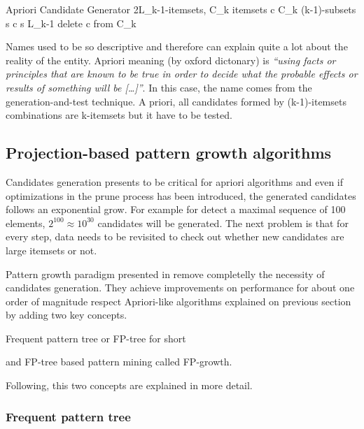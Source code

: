 \begin{pseudocode}{Apriori Candidate Generator 2}{L_{k-1}-itemsets, C_{k}}
\label{pc:apriori_candidate_generator2}
    \FORALL itemsets \quad c \in C_{k} \DO
    \BEGIN
        \FORALL (k-1)-subsets \quad s \in c \DO
        \BEGIN
            \IF s \not\in  L_{k-1} \THEN
                delete \quad c \quad from \quad C_{k}\\
        \END
    \END
\end{pseudocode}

Names used to be so descriptive and therefore can explain quite a lot about the
reality of the entity. Apriori meaning (by oxford dictonary) is {\it “using facts or
principles that are known to be true in order to decide what the probable
effects or results of something will be [\dots]”}. In this case, the name comes
from the generation-and-test technique. A priori, all candidates formed by
(k-1)-itemsets combinations are k-itemsets but it have to be tested.

\subsection{Projection-based pattern growth
algorithms}\label{ss:projection_based}

Candidates generation presents to be critical for apriori algorithms and even if
optimizations in the prune process has been introduced, the generated candidates
follows an exponential grow. For example for detect a maximal sequence of 100
elements, $2^{100} \approx 10^{30}$ candidates will be generated. The next
problem is that for every step, data needs to be revisited to check out whether 
new candidates are large itemsets or not. 

Pattern growth paradigm presented in \cite{han2000mining1} remove
completelly the necessity of candidates generation. They achieve improvements on
performance for about one order of magnitude respect Apriori-like algorithms
explained on previous section by adding two key concepts. 
\begin{enumerate*}[label=(\roman*)]
  \item Frequent pattern tree or FP-tree for short
  \item and FP-tree based pattern mining called FP-growth.
\end{enumerate*}
Following, this two concepts are explained in more detail.

\subsubsection{Frequent pattern tree}

